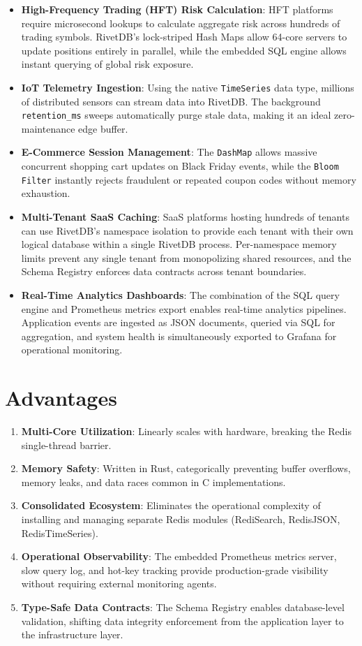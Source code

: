 \begin{itemize}[leftmargin=2.5em]
    \item \textbf{High-Frequency Trading (HFT) Risk Calculation}: HFT platforms require microsecond lookups to calculate aggregate risk across hundreds of trading symbols. RivetDB's lock-striped Hash Maps allow 64-core servers to update positions entirely in parallel, while the embedded SQL engine allows instant querying of global risk exposure.
    \item \textbf{IoT Telemetry Ingestion}: Using the native \texttt{TimeSeries} data type, millions of distributed sensors can stream data into RivetDB. The background \texttt{retention\_ms} sweeps automatically purge stale data, making it an ideal zero-maintenance edge buffer.
    \item \textbf{E-Commerce Session Management}: The \texttt{DashMap} allows massive concurrent shopping cart updates on Black Friday events, while the \texttt{Bloom Filter} instantly rejects fraudulent or repeated coupon codes without memory exhaustion.
    \item \textbf{Multi-Tenant SaaS Caching}: SaaS platforms hosting hundreds of tenants can use RivetDB's namespace isolation to provide each tenant with their own logical database within a single RivetDB process. Per-namespace memory limits prevent any single tenant from monopolizing shared resources, and the Schema Registry enforces data contracts across tenant boundaries.
    \item \textbf{Real-Time Analytics Dashboards}: The combination of the SQL query engine and Prometheus metrics export enables real-time analytics pipelines. Application events are ingested as JSON documents, queried via SQL for aggregation, and system health is simultaneously exported to Grafana for operational monitoring.
\end{itemize}

\section{Advantages}

\begin{enumerate}[leftmargin=2.5em]
    \item \textbf{Multi-Core Utilization}: Linearly scales with hardware, breaking the Redis single-thread barrier.
    \item \textbf{Memory Safety}: Written in Rust, categorically preventing buffer overflows, memory leaks, and data races common in C implementations.
    \item \textbf{Consolidated Ecosystem}: Eliminates the operational complexity of installing and managing separate Redis modules (RediSearch, RedisJSON, RedisTimeSeries).
    \item \textbf{Operational Observability}: The embedded Prometheus metrics server, slow query log, and hot-key tracking provide production-grade visibility without requiring external monitoring agents.
    \item \textbf{Type-Safe Data Contracts}: The Schema Registry enables database-level validation, shifting data integrity enforcement from the application layer to the infrastructure layer.
\end{enumerate}

